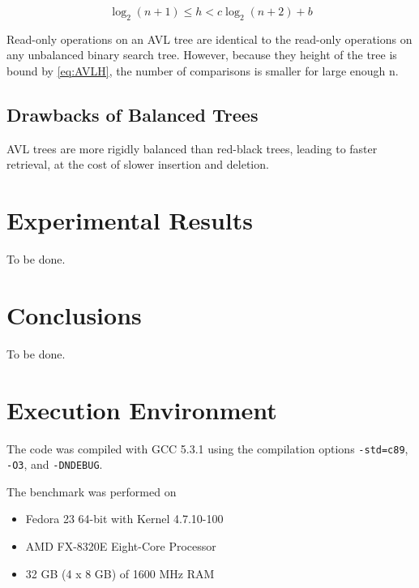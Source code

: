 \documentclass[12pt]{elsarticle}
\begin{document}
\begin{equation} \label{eq:AVLH}
    \log_2 \left(n + 1\right) \leq h < c \log_2 \left(n + 2\right) + b
\end{equation}

Read-only operations on an AVL tree are identical to the read-only operations
on any unbalanced binary search tree. However, because they height of the tree
is bound by \ref{eq:AVLH}, the number of comparisons is smaller for large enough
n.


\subsection{Drawbacks of Balanced Trees}

AVL trees are more rigidly balanced than red-black trees, leading to faster
retrieval, at the cost of slower insertion and deletion.

\section{Experimental Results}

To be done.

\section{Conclusions}

To be done.

\appendix

\section{Execution Environment} \label{ap:ENV}

The code was compiled with GCC 5.3.1 using the compilation options
\texttt{-std=c89}, \texttt{-O3}, and \texttt{-DNDEBUG}.

The benchmark was performed on
\begin{itemize}
    \item Fedora 23 64-bit with Kernel 4.7.10-100
    \item AMD FX-8320E Eight-Core Processor
    \item 32 GB (4 x 8 GB) of 1600 MHz RAM
\end{itemize}
\end{document}
